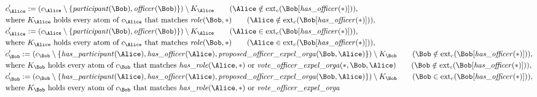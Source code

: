 \begin{align*}
&
c'_
{
\Alice
}
 := 
(c_
{
\Alice
}
 \setminus 
\{
\mathit{\detokenize{
participant
}}
(
\Bob
)
,
\mathit{\detokenize{
officer
}}
(
\Bob
)
\}
) \setminus K_
{
\Alice
}
 \qquad (
\Alice
 \notin 
\mathrm{ext}_c(
\Bob
[
\mathit{\detokenize{
has_officer
}}
(
\ast
)
]
)
)
,\\
&
\text{where } K_
{
\Alice
}
 \text{ holds every atom of } c_
{
\Alice
}
 \text{ that matches } 
\mathit{\detokenize{
role
}}
(
\Bob
,
\ast
)
 \qquad (
\Alice
 \notin 
\mathrm{ext}_c(
\Bob
[
\mathit{\detokenize{
has_officer
}}
(
\ast
)
]
)
)
,\\
&
c'_
{
\Alice
}
 := 
(c_
{
\Alice
}
 \setminus 
\{
\mathit{\detokenize{
participant
}}
(
\Bob
)
,
\mathit{\detokenize{
officer
}}
(
\Bob
)
\}
) \setminus K_
{
\Alice
}
 \qquad (
\Alice
 \in 
\mathrm{ext}_c(
\Bob
[
\mathit{\detokenize{
has_officer
}}
(
\ast
)
]
)
)
,\\
&
\text{where } K_
{
\Alice
}
 \text{ holds every atom of } c_
{
\Alice
}
 \text{ that matches } 
\mathit{\detokenize{
role
}}
(
\Bob
,
\ast
)
 \qquad (
\Alice
 \in 
\mathrm{ext}_c(
\Bob
[
\mathit{\detokenize{
has_officer
}}
(
\ast
)
]
)
)
,\\
&
c'_
{
\Bob
}
 := 
(c_
{
\Bob
}
 \setminus 
\{
\mathit{\detokenize{
has_participant
}}
(
\Alice
)
,
\mathit{\detokenize{
has_officer
}}
(
\Alice
)
,
\mathit{\detokenize{
proposed_officer_expel_orga
}}
(
\Bob
,
\Alice
)
\}
) \setminus K_
{
\Bob
}
 \qquad (
\Bob
 \notin 
\mathrm{ext}_c(
\Bob
[
\mathit{\detokenize{
has_officer
}}
(
\ast
)
]
)
)
,\\
&
\text{where } K_
{
\Bob
}
 \text{ holds every atom of } c_
{
\Bob
}
 \text{ that matches } 
\mathit{\detokenize{
has_role
}}
(
\Alice
,
\ast
)
 \text{ or } 
\mathit{\detokenize{
vote_officer_expel_orga
}}
(
\ast
,
\Bob
,
\Alice
)
 \qquad (
\Bob
 \notin 
\mathrm{ext}_c(
\Bob
[
\mathit{\detokenize{
has_officer
}}
(
\ast
)
]
)
)
,\\
&
c'_
{
\Bob
}
 := 
(c_
{
\Bob
}
 \setminus 
\{
\mathit{\detokenize{
has_participant
}}
(
\Alice
)
,
\mathit{\detokenize{
has_officer
}}
(
\Alice
)
,
\mathit{\detokenize{
proposed_officer_expel_orga
}}
(
\Bob
,
\Alice
)
\}
) \setminus K_
{
\Bob
}
 \qquad (
\Bob
 \in 
\mathrm{ext}_c(
\Bob
[
\mathit{\detokenize{
has_officer
}}
(
\ast
)
]
)
)
,\\
&
\text{where } K_
{
\Bob
}
 \text{ holds every atom of } c_
{
\Bob
}
 \text{ that matches } 
\mathit{\detokenize{
has_role
}}
(
\Alice
,
\ast
)
 \text{ or } 
\mathit{\detokenize{
vote_officer_expel_orga
}}
\end{align*}
